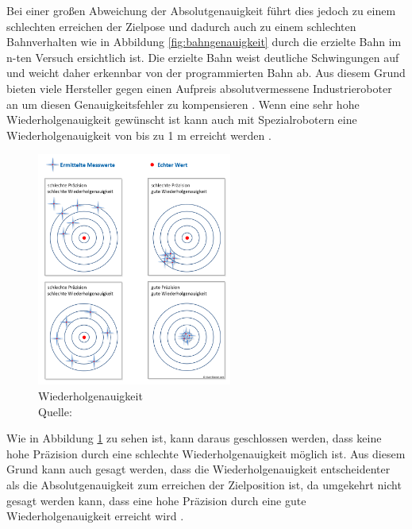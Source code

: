 Bei einer großen Abweichung der Absolutgenauigkeit führt dies jedoch zu einem schlechten erreichen der Zielpose und dadurch auch zu einem schlechten Bahnverhalten wie in Abbildung \ref{fig:bahngenauigkeit} durch die erzielte Bahn im n-ten Versuch ersichtlich ist. Die erzielte Bahn weist deutliche Schwingungen auf und weicht daher erkennbar von der programmierten Bahn ab. Aus diesem Grund bieten viele Hersteller gegen einen Aufpreis absolutvermessene Industrieroboter an um diesen Genauigkeitsfehler zu kompensieren \cite[29\psq]{pott_industrielle_2019}. Wenn eine sehr hohe Wiederholgenauigkeit gewünscht ist kann auch mit Spezialrobotern eine Wiederholgenauigkeit von bis zu 1 \si{\micro}m erreicht werden \cite{noauthor_genauigkeit_nodate}.

\begin{figure}[htb]
	\centering
	\includegraphics[width=0.57\textwidth]{images/stand_der_technik/wiederholgenauigkeit}
	\caption[Wiederholgenauigkeit]{Wiederholgenauigkeit \\Quelle: \cite{noauthor_prazision_nodate}}
	\label{fig:wiederholgenauigkeit}
\end{figure}
\FloatBarrier

Wie in Abbildung \ref{fig:wiederholgenauigkeit} zu sehen ist, kann daraus geschlossen werden, dass keine hohe Präzision durch eine schlechte Wiederholgenauigkeit möglich ist. Aus diesem Grund kann auch gesagt werden, dass die Wiederholgenauigkeit entscheidenter als die Absolutgenauigkeit zum erreichen der Zielposition ist, da umgekehrt nicht gesagt werden kann, dass eine hohe Präzision durch eine gute Wiederholgenauigkeit erreicht wird \cite{noauthor_genauigkeit_nodate}.


